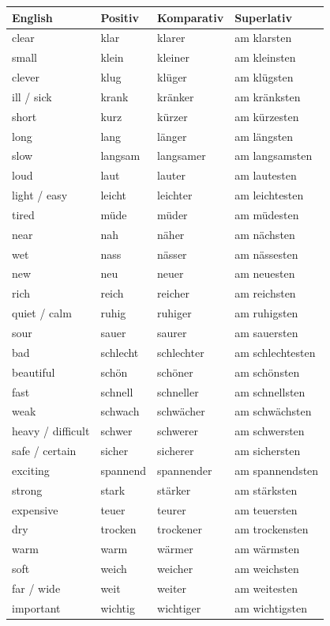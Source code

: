\hfill
\begin{minipage}[t]{0.49\textwidth}
\vspace{0pt}
\footnotesize
\setlength{\tabcolsep}{2pt}
\renewcommand{\arraystretch}{1.12}
\begin{tabularx}{\linewidth}{@{}lllX@{}}
\toprule
English & Positiv & Komparativ & Superlativ \\
\midrule
clear & klar & klarer & am klarsten \\
small & klein & kleiner & am kleinsten \\
clever & klug & klüger & am klügsten \\
ill / sick & krank & kränker & am kränksten \\
short & kurz & kürzer & am kürzesten \\
long & lang & länger & am längsten \\
slow & langsam & langsamer & am langsamsten \\
loud & laut & lauter & am lautesten \\
light / easy & leicht & leichter & am leichtesten \\
tired & müde & müder & am müdesten \\
near & nah & näher & am nächsten \\
wet & nass & nässer & am nässesten \\
new & neu & neuer & am neuesten \\
rich & reich & reicher & am reichsten \\
quiet / calm & ruhig & ruhiger & am ruhigsten \\
sour & sauer & saurer & am sauersten \\
bad & schlecht & schlechter & am schlechtesten \\
beautiful & schön & schöner & am schönsten \\
fast & schnell & schneller & am schnellsten \\
weak & schwach & schwächer & am schwächsten \\
heavy / difficult & schwer & schwerer & am schwersten \\
safe / certain & sicher & sicherer & am sichersten \\
exciting & spannend & spannender & am spannendsten \\
strong & stark & stärker & am stärksten \\
expensive & teuer & teurer & am teuersten \\
dry & trocken & trockener & am trockensten \\
warm & warm & wärmer & am wärmsten \\
soft & weich & weicher & am weichsten \\
far / wide & weit & weiter & am weitesten \\
important & wichtig & wichtiger & am wichtigsten \\
\bottomrule
\end{tabularx}
\end{minipage}
\par\smallskip

